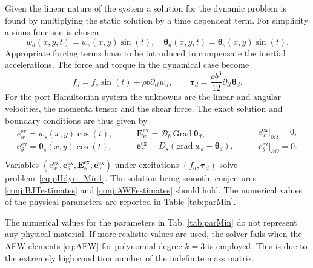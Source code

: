 Given the linear nature of the system a solution for the dynamic problem is found by multiplying the static solution by a time dependent term. For simplicity a sinus function is chosen
\[
w_d(x,y,t) = w_s(x,y) \sin(t), \quad \bm{\theta}_d(x,y,t) = \bm\theta_s(x,y) \sin(t).
\]
Appropriate forcing terms have to be introduced to compensate the inertial accelerations. The force and torque in the dynamical case become
\begin{equation*}
f_d = f_s \sin(t) + \rho b \partial_{tt} w_d, \qquad \bm{\tau}_d = \frac{\rho b^3}{12} \partial_{tt} \bm{\theta}_d.
\end{equation*}
For the port-Hamiltonian system the unknowns are the linear and angular velocities, the momenta tensor and the shear force. The exact solution and boundary conditions are thus given by
\begin{equation}
\begin{aligned}
e_w^\text{ex} = w_s(x,y) \cos(t), \\
\bm{e}_\theta^\text{ex} = \bm\theta_s(x,y) \cos(t), \\
\end{aligned} \qquad
\begin{aligned}
\bm{E}_\kappa^\text{ex} =  \bm{\mathcal{D}}_b \ \mathrm{Grad} \ \bm{\theta}_d, \\
\bm{e}_\gamma^\text{ex} = D_s(\mathrm{grad} \ w_d - \bm{\theta}_d), \\
\end{aligned}
\qquad
\begin{aligned}
e_w^\text{ex}\vert_{\partial\Omega} = 0, \\
\bm{e}_\theta^\text{ex}\vert_{\partial\Omega} = 0. \\
\end{aligned}
\end{equation}
Variables $(e_w^\text{ex}, \bm{e}_\theta^\text{ex}, \bm{E}_\kappa^\text{ex}, \bm{e}_\gamma^\text{ex})$ under excitations $(f_d, \bm{\tau}_d)$ solve problem~\eqref{eq:pHdyn_Min1}. The solution being smooth, conjectures \ref{conj:BJTestimates} and \ref{conj:AWFestimates} should hold. The numerical values of the physical parameters are reported in Table \ref{tab:parMin}.  

\begin{remark}
The numerical values for the parameters in Tab. \ref{tab:parMin} do not represent any physical material. If more realistic values are used, the solver fails when the AFW elements \eqref{eq:AFW} for polynomial degree $k=3$ is employed. This is due to the extremely high condition number of the indefinite mass matrix.
\end{remark}

